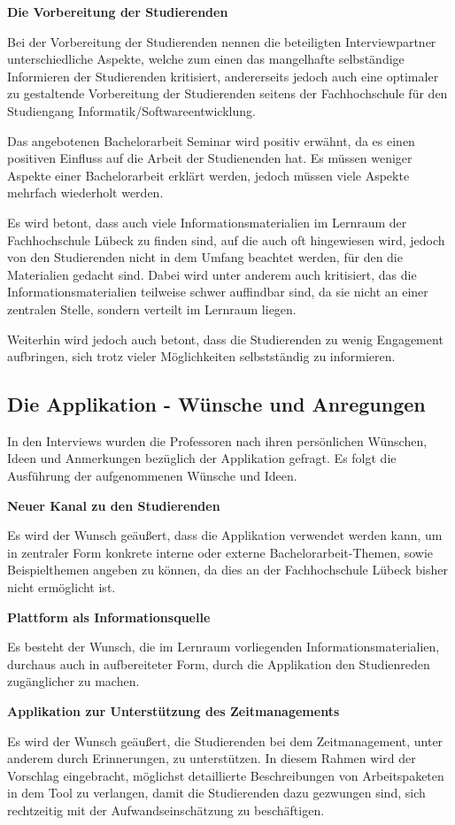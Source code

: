 \documentclass[bibliography=totoc,listof=totoc,BCOR=5mm,DIV=12,oneside]{scrbook}
\begin{document}
\newpage
\par \bigskip \textbf{Die Vorbereitung der Studierenden}
\par Bei der Vorbereitung der Studierenden nennen die beteiligten Interviewpartner unterschiedliche Aspekte, welche zum einen das mangelhafte selbständige Informieren der Studierenden kritisiert, andererseits jedoch auch eine optimaler zu gestaltende Vorbereitung der Studierenden seitens der Fachhochschule für den Studiengang Informatik/Softwareentwicklung.
\par \medskip Das angebotenen Bachelorarbeit Seminar wird positiv erwähnt, da es einen positiven Einfluss auf die Arbeit der Studienenden hat. Es müssen weniger Aspekte einer Bachelorarbeit erklärt werden, jedoch müssen viele Aspekte mehrfach wiederholt werden. 
\par Es wird betont, dass auch viele Informationsmaterialien im Lernraum der Fachhochschule Lübeck zu finden sind, auf die auch oft hingewiesen wird, jedoch von den Studierenden nicht in dem Umfang beachtet werden, für den die Materialien gedacht sind. Dabei wird unter anderem auch kritisiert, das die Informationsmaterialien teilweise schwer auffindbar sind, da sie nicht an einer zentralen Stelle, sondern verteilt im Lernraum liegen. 
\par Weiterhin wird jedoch auch betont, dass die Studierenden zu wenig Engagement aufbringen, sich trotz vieler Möglichkeiten selbstständig zu informieren. 

\subsection{Die Applikation - Wünsche und Anregungen}
\par In den Interviews wurden die Professoren nach ihren persönlichen Wünschen, Ideen und Anmerkungen bezüglich der Applikation gefragt. Es folgt die Ausführung der aufgenommenen Wünsche und Ideen.

\par \bigskip \textbf{Neuer Kanal zu den Studierenden}
\par Es wird der Wunsch geäußert, dass die Applikation verwendet werden kann, um in zentraler Form konkrete interne oder externe Bachelorarbeit-Themen, sowie Beispielthemen angeben zu können, da dies an der Fachhochschule Lübeck bisher nicht ermöglicht ist.
\par \bigskip \textbf{Plattform als Informationsquelle}
\par Es besteht der Wunsch, die im Lernraum vorliegenden Informationsmaterialien, durchaus auch in aufbereiteter Form, durch die Applikation den Studienreden zugänglicher zu machen.
\par \bigskip \textbf{Applikation zur Unterstützung des Zeitmanagements}
\par Es wird der Wunsch geäußert, die Studierenden bei dem Zeitmanagement, unter anderem durch Erinnerungen, zu unterstützen. In diesem Rahmen wird der Vorschlag eingebracht, möglichst detaillierte Beschreibungen von Arbeitspaketen in dem Tool zu verlangen, damit die Studierenden dazu gezwungen sind, sich rechtzeitig mit der Aufwandseinschätzung zu beschäftigen.
\end{document}
